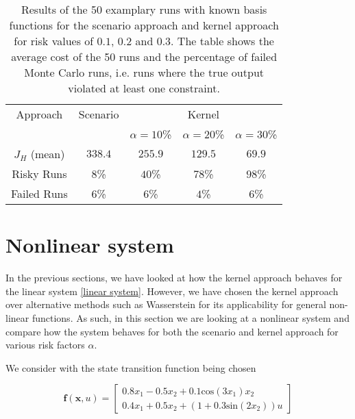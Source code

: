 \begin{table}
\centering
\begin{tabular}{|c| c| c| c| c|}
\hline
Approach & Scenario &  \multicolumn{3}{|c|}{Kernel}\\  \cline{3-5} & &  $\alpha = 10$\% & $\alpha = 20$\% & $\alpha = 30$\% \\
\hline
$J_H$ (mean) & $338.4$ & $255.9$ & $129.5$ & $69.9$\\
\hline
Risky Runs & $8$\% & $40$\% & $78$\% & $98$\% \\
\hline
Failed Runs & $6$\% & $6$\% & $4$\% & $6$\% \\
\hline
\end{tabular}
\caption{Results of the 50 examplary runs with known basis functions for the scenario approach and kernel approach for risk values of $0.1$, $0.2$ and $0.3$. The table shows the average cost of the 50 runs and the percentage of failed Monte Carlo runs, i.e. runs where the true output violated at least one constraint.}
\label{tab:results_corridor}
\end{table} 


\section{Nonlinear system} \label{Nonlinear system}

In the previous sections, we have looked at how the kernel approach behaves for the linear system \eqref{linear system}. However, we have chosen the kernel approach over alternative methods such as Wasserstein for its applicability for general non-linear functions. As such, in this section we are looking at a nonlinear system and compare how the system behaves for both the scenario and kernel approach for various risk factors $\alpha$.

We consider with the state transition function being chosen

\begin{equation} \label{nonlinear system}
\boldsymbol{f}(\boldsymbol{x}, u) = 
\begin{bmatrix}
0.8  x_1 - 0.5 x_2 + 0.1 \text{cos} ( 3 x_1) x_2 \\
0.4 x_1 + 0.5 x_2 + (1 + 0.3 \text{sin} (2 x_2)) u
\end{bmatrix}
\end{equation}

